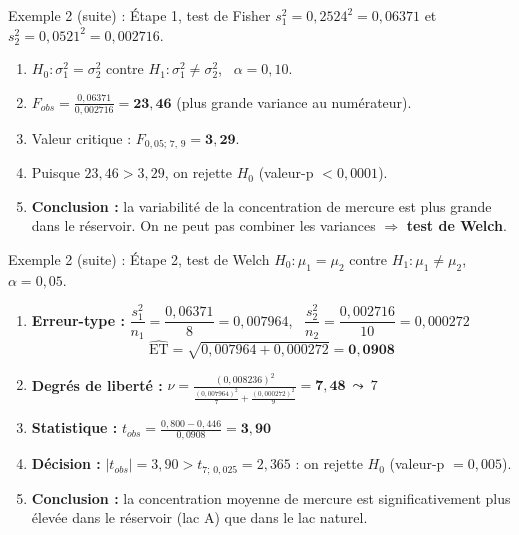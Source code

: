 \documentclass{BeamerTemplate}
\begin{document}
\begin{frame}[t]{Exemple 2 (suite) : Étape 1, test de Fisher}
  $s_1^2 = 0{,}2524^2 = 0{,}06371$ \quad et \quad $s_2^2 = 0{,}0521^2 = 0{,}002716$.

  \medskip
  \begin{enumerate}\itemsep 3mm
    \item $H_0: \sigma_1^2 = \sigma_2^2$ contre $H_1: \sigma_1^2 \ne \sigma_2^2$, \ $\alpha = 0{,}10$.
    \item $\displaystyle F_{obs} = \frac{0{,}06371}{0{,}002716} = \mathbf{23{,}46}$ \quad (plus grande variance au numérateur).
    \item<2-> Valeur critique : $F_{0{,}05;\, 7,\, 9} = \mathbf{3{,}29}$.
    \item<2-> Puisque $23{,}46 > 3{,}29$, on \alert{rejette $H_0$} (valeur-p $< 0{,}0001$).
    \item<2-> \textbf{Conclusion :} la variabilité de la concentration de mercure est plus grande dans le réservoir. On \alert{ne peut pas} combiner les variances $\Rightarrow$ \textbf{test de Welch}.
  \end{enumerate}
\end{frame}

\begin{frame}[t]{Exemple 2 (suite) : Étape 2, test de Welch}
  $H_0: \mu_1 = \mu_2$ contre $H_1: \mu_1 \ne \mu_2$, \ $\alpha = 0{,}05$.

  \medskip
  \begin{enumerate}\itemsep 2mm
    \item \textbf{Erreur-type :} $\dfrac{s_1^2}{n_1} = \dfrac{0{,}06371}{8} = 0{,}007964$, \ $\dfrac{s_2^2}{n_2} = \dfrac{0{,}002716}{10} = 0{,}000272$
      $$\widehat{\text{ET}} = \sqrt{0{,}007964 + 0{,}000272} = \mathbf{0{,}0908}$$
    \item \textbf{Degrés de liberté :}
      $\displaystyle \nu = \frac{(0{,}008236)^2}{\frac{(0{,}007964)^2}{7} + \frac{(0{,}000272)^2}{9}} = \mathbf{7{,}48} \ \leadsto \ 7$
    \item \textbf{Statistique :} $\displaystyle t_{obs} = \frac{0{,}800 - 0{,}446}{0{,}0908} = \mathbf{3{,}90}$
    \item<2-> \textbf{Décision :} $|t_{obs}| = 3{,}90 > t_{7;\,0{,}025} = 2{,}365$ : on \alert{rejette $H_0$} (valeur-p $= 0{,}005$).
    \item<2-> \textbf{Conclusion :} la concentration moyenne de mercure est significativement plus élevée dans le réservoir (lac A) que dans le lac naturel.
  \end{enumerate}
\end{frame}
\end{document}

